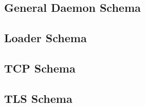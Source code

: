 \documentclass{article}
\begin{document}
\subsection{General Daemon Schema}


\subsection{Loader Schema}


\subsection{TCP Schema}


\subsection{TLS Schema}



\end{document}
